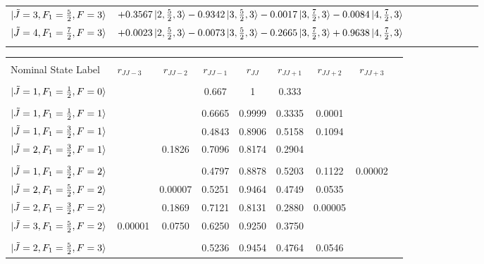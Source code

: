 \documentclass[8pt]{article}
\begin{document}
\begin{table}[]
\begin{tabular}{l l c c c c c c r}
		$\ket{\tilde{J}  = 3, F_1 = \frac{5}{2}, F = 3}$ & $+0.3567\ket{2,\frac{5}{2},3} - 0.9342\ket{3,\frac{5}{2},3} -0.0017\ket{3,\frac{7}{2},3} -0.0084\ket{4,\frac{7}{2},3}$  \\
		
		$\ket{\tilde{J}  = 4, F_1 = \frac{7}{2}, F = 3}$ & $+0.0023\ket{2,\frac{5}{2},3} - 0.0073\ket{3,\frac{5}{2},3} -0.2665\ket{3,\frac{7}{2},3} +0.9638\ket{4,\frac{7}{2},3}$   \\
		\\
		\hline
		\hline
	\end{tabular}
\end{table}


\begin{table}[]
	\scriptsize
	
	\begin{tabular}{l l c c c c c c r}
		\hline
		\hline
		\\
		Nominal State Label & $r_{JJ-3}$ &$r_{JJ-2}$ & $r_{JJ-1}$ & $r_{JJ}$ & $r_{JJ+1}$ & $r_{JJ+2}$ & $r_{JJ+3}$ \\
		\hline
		\\
		$\ket{\tilde{J}  = 1, F_1 = \frac{1}{2}, F = 0}$ & &  & 0.667 & 1 & 0.333 & &  \\ 
		\\
		$\ket{\tilde{J}  = 1, F_1 = \frac{1}{2}, F = 1}$ & &   & 0.6665 & 0.9999 & 0.3335 & 0.0001 &   \\
		$\ket{\tilde{J}  = 1, F_1 = \frac{3}{2}, F = 1}$ &  &  & 0.4843 & 0.8906 & 0.5158 & 0.1094 &   \\
		$\ket{\tilde{J}  = 2, F_1 = \frac{3}{2}, F = 1}$ & & 0.1826 & 0.7096 & 0.8174 & 0.2904 & &    \\
		\\
		$\ket{\tilde{J}  = 1, F_1 = \frac{3}{2}, F = 2}$ & & & 0.4797 & 0.8878 & 0.5203 & 0.1122 & 0.00002 \\
		
		$\ket{\tilde{J}  = 2, F_1 = \frac{5}{2}, F = 2}$ & & 0.00007 & 0.5251 & 0.9464 & 0.4749 & 0.0535 &  \\
		
		$\ket{\tilde{J}  = 2, F_1 = \frac{3}{2}, F = 2}$  & & 0.1869 & 0.7121 & 0.8131 & 0.2880 & 0.00005 &  \\
		
		$\ket{\tilde{J}  = 3, F_1 = \frac{5}{2}, F = 2}$ & 0.00001 & 0.0750 & 0.6250 & 0.9250 & 0.3750 &  &  \\
		\\
		
		$\ket{\tilde{J}  = 2, F_1 = \frac{5}{2}, F = 3}$ & & & 0.5236 & 0.9454 & 0.4764 & 0.0546 &  \\
		

\end{tabular}
\end{table}
\end{document}
